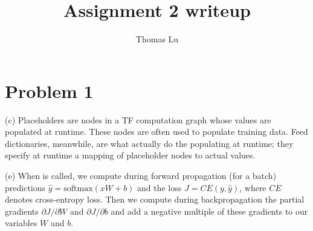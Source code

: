 \documentclass{article}
\title{Assignment 2 writeup}
\author{Thomas Lu}
\date{}
\begin{document}
\maketitle
\section{Problem 1}
(c) Placeholders are nodes in a TF computation graph whose values are populated at runtime. These nodes are often used to populate training data. Feed dictionaries, meanwhile, are what actually do the populating at runtime; they specify at runtime a mapping of placeholder nodes to actual values.

(e) When  is called, we compute during forward propagation (for a batch) predictions $\hat{y} = \text{softmax}(xW + b)$ and the loss $J = CE(y, \hat{y})$, where $CE$ denotes cross-entropy loss. Then we compute during backpropagation the partial gradients $\partial J/\partial W$ and $\partial J/\partial b$ and add a negative multiple of these gradients to our variables $W$ and $b$.
\end{document}
